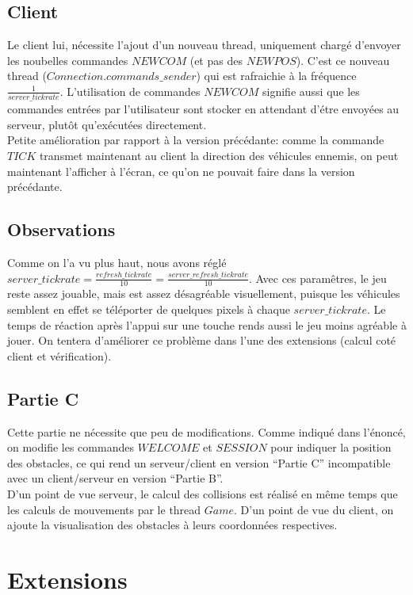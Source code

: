 \documentclass{article}
\begin{document}
\subsection{Client}
Le client lui, nécessite l'ajout d'un nouveau thread, uniquement chargé d'envoyer les noubelles commandes $NEWCOM$ (et pas des $NEWPOS$). C'est ce nouveau thread ($Connection.commands\_sender$) qui est rafraichie à la fréquence $\frac{1}{server\_tickrate}$. L'utilisation de commandes $NEWCOM$ signifie aussi que les commandes entrées par l'utilisateur sont stocker en attendant d'étre envoyées au serveur, plutôt qu'exécutées directement.\\
Petite amélioration par rapport à la version précédante: comme la commande $TICK$ transmet maintenant au client la direction des véhicules ennemis, on peut maintenant l'afficher à l'écran, ce qu'on ne pouvait faire dans la version précédante.

\subsection{Observations}
Comme on l'a vu plus haut, nous avons réglé $server\_tickrate = \frac{refresh\_tickrate}{10} = \frac{server\_refresh\_tickrate}{10}$. Avec ces paramêtres, le jeu reste assez jouable, mais est assez désagréable visuellement, puisque les véhicules semblent en effet se téléporter de quelques pixels à chaque $server\_tickrate$. Le temps de réaction après l'appui sur une touche rends aussi le jeu moins agréable à jouer. On tentera d'améliorer ce problème dans l'une des extensions (calcul coté client et vérification).

\subsection{Partie C}
Cette partie ne nécessite que peu de modifications. Comme indiqué dans l'énoncé, on modifie les commandes $WELCOME$ et $SESSION$ pour indiquer la position des obstacles, ce qui rend un serveur/client en version ``Partie C'' incompatible avec un client/serveur en version ``Partie B''.\\
D'un point de vue serveur, le calcul des collisions est réalisé en même temps que les calculs de mouvements par le thread $Game$. D'un point de vue du client, on ajoute la visualisation des obstacles à leurs coordonnées respectives.

\section{Extensions}
\end{document}
